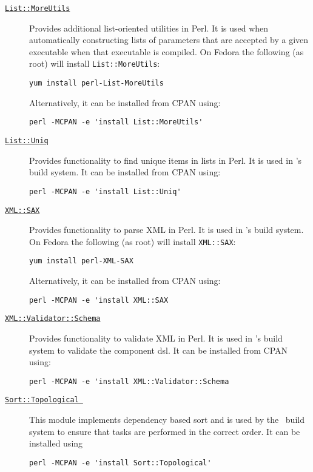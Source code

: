 \begin{description}
\item [\href{http://search.cpan.org/~adamk/List-MoreUtils-0.33/lib/List/MoreUtils.pm}{{\tt List::MoreUtils}}] Provides additional list-oriented utilities in Perl. It is used when automatically constructing lists of parameters that are accepted by a given executable when that executable is compiled. On Fedora the following (as root) will install {\tt List::MoreUtils}:
\begin{verbatim}
yum install perl-List-MoreUtils
\end{verbatim}
Alternatively, it can be installed from CPAN using:
\begin{verbatim}
perl -MCPAN -e 'install List::MoreUtils'
\end{verbatim}

\item [\href{http://search.cpan.org/~jfitz/List-Uniq-0.20/lib/List/Uniq.pm}{{\tt List::Uniq}}] Provides functionality to find unique items in lists in Perl. It is used in \glc's build system. It can be installed from CPAN using:
\begin{verbatim}
perl -MCPAN -e 'install List::Uniq'
\end{verbatim}

\item [\href{http://search.cpan.org/~grantm/XML-SAX-0.99/SAX.pm}{{\tt XML::SAX}}] Provides functionality to parse XML in Perl. It is used in \glc's build system. On Fedora the following (as root) will install {\tt XML::SAX}:
\begin{verbatim}
yum install perl-XML-SAX
\end{verbatim}
Alternatively, it can be installed from CPAN using:
\begin{verbatim}
perl -MCPAN -e 'install XML::SAX
\end{verbatim}

\item [\href{http://search.cpan.org/~samtregar/XML-Validator-Schema-1.08/Schema.pm}{{\tt XML::Validator::Schema}}] Provides functionality to validate XML in Perl. It is used in \glc's build system to validate the \gls{component} \gls{dsl}. It can be installed from CPAN using:
\begin{verbatim}
perl -MCPAN -e 'install XML::Validator::Schema
\end{verbatim}

\item [\href{http://search.cpan.org/~kstephens/Data-Match-0.06/lib/Sort/Topological.pm}{{\tt Sort::Topological }}] This module implements dependency based sort and is used by the \glc\ build system to ensure that tasks are performed in the correct order. It can be installed using
\begin{verbatim}
perl -MCPAN -e 'install Sort::Topological'
\end{verbatim}


\end{description}
